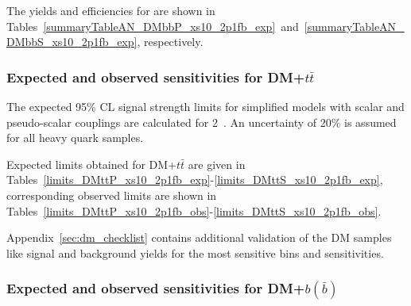 \clearpage 

 
\clearpage


The yields and efficiencies for \DMbb are shown in Tables~\ref{summaryTableAN_DMbbP_xs10_2p1fb_exp}~and~\ref{summaryTableAN_DMbbS_xs10_2p1fb_exp}, respectively. 

 
\clearpage


\subsubsection{Expected and observed sensitivities for DM+$t\bar{t}$}

The expected 95\% CL signal strength limits for simplified \DMtt models with scalar and
pseudo-scalar couplings are calculated for 2~\ifb. An uncertainty of 20\% is assumed for all 
heavy quark samples.





\clearpage
Expected limits obtained for DM+$t\bar{t}$ are given in Tables~\ref{limits_DMttP_xs10_2p1fb_exp}-\ref{limits_DMttS_xs10_2p1fb_exp}, corresponding observed limits are shown in Tables~\ref{limits_DMttP_xs10_2p1fb_obs}-\ref{limits_DMttS_xs10_2p1fb_obs}.







Appendix~\ref{sec:dm_checklist} contains additional validation of the \DMj DM samples like signal and background yields for the most sensitive bins and sensitivities.

\subsubsection{Expected and observed sensitivities for DM+$b(\bar{b})$}

